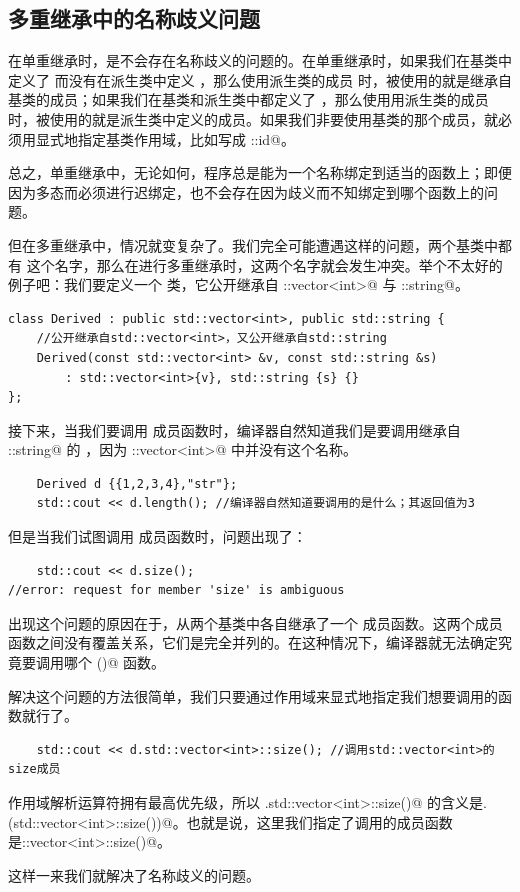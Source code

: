 \subsection*{多重继承中的名称歧义问题}
在单重继承时，是不会存在名称歧义的问题的。在单重继承时，如果我们在基类中定义了 \lstinline@id@ 而没有在派生类中定义 \lstinline@id@，那么使用派生类的成员 \lstinline@id@ 时，被使用的就是继承自基类的成员；如果我们在基类和派生类中都定义了 \lstinline@id@，那么使用用派生类的成员 \lstinline@id@ 时，被使用的就是派生类中定义的成员。如果我们非要使用基类的那个成员，就必须用显式地指定基类作用域，比如写成 \lstinline@Base::id@。\par
总之，单重继承中，无论如何，程序总是能为一个名称绑定到适当的函数上；即便因为多态而必须进行迟绑定，也不会存在因为歧义而不知绑定到哪个函数上的问题。\par
但在多重继承中，情况就变复杂了。我们完全可能遭遇这样的问题，两个基类中都有 \lstinline@id@ 这个名字，那么在进行多重继承时，这两个名字就会发生冲突。举个不太好的例子吧：我们要定义一个 \lstinline@Derived@ 类，它公开继承自 \lstinline@std::vector<int>@ 与 \lstinline@std::string@。
\begin{lstlisting}
class Derived : public std::vector<int>, public std::string {
    //公开继承自std::vector<int>，又公开继承自std::string
    Derived(const std::vector<int> &v, const std::string &s)
        : std::vector<int>{v}, std::string {s} {}
};
\end{lstlisting}
接下来，当我们要调用 \lstinline@length@ 成员函数时，编译器自然知道我们是要调用继承自 \lstinline@std::string@ 的 \lstinline@length@，因为 \lstinline@std::vector<int>@ 中并没有这个名称。
\begin{lstlisting}
    Derived d {{1,2,3,4},"str"};
    std::cout << d.length(); //编译器自然知道要调用的是什么；其返回值为3
\end{lstlisting}
但是当我们试图调用 \lstinline@size@ 成员函数时，问题出现了：
\begin{lstlisting}
    std::cout << d.size();
//error: request for member 'size' is ambiguous
\end{lstlisting}
出现这个问题的原因在于，\lstinline@Derived@ 从两个基类中各自继承了一个 \lstinline@size@ 成员函数。这两个成员函数之间没有覆盖关系，它们是完全并列的。在这种情况下，编译器就无法确定究竟要调用哪个 \lstinline@size()@ 函数。\par
解决这个问题的方法很简单，我们只要通过作用域来显式地指定我们想要调用的函数就行了。
\begin{lstlisting}
    std::cout << d.std::vector<int>::size(); //调用std::vector<int>的size成员
\end{lstlisting}
作用域解析运算符拥有最高优先级，所以 \lstinline@d.std::vector<int>::size()@ 的含义是\newline\lstinline@d.(std::vector<int>::size())@。也就是说，这里我们指定了调用的成员函数是\newline\lstinline@std::vector<int>::size()@。\par
这样一来我们就解决了名称歧义的问题。\par
